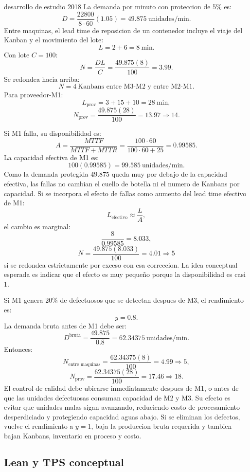 \begin{pautacompleta}{desarrollo de estudio 2018}
La demanda por minuto con proteccion de 5\% es:
\[
  D=\frac{22800}{8\cdot 60}(1.05)=49.875\ \text{unidades/min}.
\]
Entre maquinas, el lead time de reposicion de un contenedor incluye el viaje del Kanban y el movimiento del lote:
\[
  L=2+6=8\ \text{min}.
\]
Con lote $C=100$:
\[
  N=\frac{DL}{C}=\frac{49.875(8)}{100}=3.99.
\]
Se redondea hacia arriba:
\[
  N=4\ \text{Kanbans entre M3-M2 y entre M2-M1}.
\]
Para proveedor-M1:
\[
  L_{\text{prov}}=3+15+10=28\ \text{min},
\]
\[
  N_{\text{prov}}=\frac{49.875(28)}{100}=13.97\Rightarrow 14.
\]

Si M1 falla, su disponibilidad es:
\[
  A=\frac{MTTF}{MTTF+MTTR}
  =
  \frac{100\cdot 60}{100\cdot 60+25}
  =0.99585.
\]
La capacidad efectiva de M1 es:
\[
  100(0.99585)=99.585\ \text{unidades/min}.
\]
Como la demanda protegida $49.875$ queda muy por debajo de la capacidad efectiva, las fallas no cambian el cuello de botella ni el numero de Kanbans por capacidad. Si se incorpora el efecto de fallas como aumento del lead time efectivo de M1:
\[
  L_{\text{efectivo}}\approx \frac{L}{A},
\]
el cambio es marginal:
\[
  \frac{8}{0.99585}=8.033,
\]
\[
  N=\frac{49.875(8.033)}{100}=4.01\Rightarrow 5
\]
si se redondea estrictamente por exceso con esa correccion. La idea conceptual esperada es indicar que el efecto es muy pequeño porque la disponibilidad es casi 1.

Si M1 genera 20\% de defectuosos que se detectan despues de M3, el rendimiento es:
\[
  y=0.8.
\]
La demanda bruta antes de M1 debe ser:
\[
  D^{\text{bruta}}=\frac{49.875}{0.8}=62.34375\ \text{unidades/min}.
\]
Entonces:
\[
  N_{\text{entre maquinas}}=\frac{62.34375(8)}{100}=4.99\Rightarrow 5,
\]
\[
  N_{\text{prov}}=\frac{62.34375(28)}{100}=17.46\Rightarrow 18.
\]
El control de calidad debe ubicarse inmediatamente despues de M1, o antes de que las unidades defectuosas consuman capacidad de M2 y M3. Su efecto es evitar que unidades malas sigan avanzando, reduciendo costo de procesamiento desperdiciado y protegiendo capacidad aguas abajo. Si se eliminan los defectos, vuelve el rendimiento a $y=1$, baja la produccion bruta requerida y tambien bajan Kanbans, inventario en proceso y costo.
\end{pautacompleta}

\subsection{Lean y TPS conceptual}

